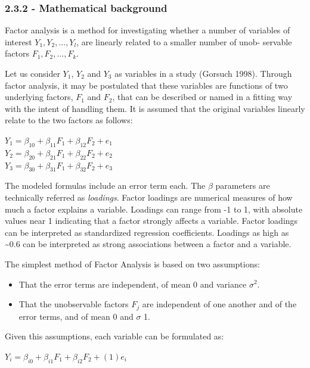 \documentclass[]{article}
\begin{document}
\subsubsection{2.3.2 - Mathematical
background}\label{mathematical-background-2}

Factor analysis is a method for investigating whether a number of
variables of interest \(Y_1, Y_2,..., Y_l\), are linearly related to a
smaller number of unob- servable factors \(F_1, F_2,..., F_k\).

Let us consider \(Y_1\), \(Y_2\) and \(Y_3\) as variables in a study
(Gorsuch 1998). Through factor analysis, it may be postulated that these
variables are functions of two underlying factors, \(F_1\) and \(F_2\),
that can be described or named in a fitting way with the intent of
handling them. It is assumed that the original variables linearly relate
to the two factors as follows:

\(Y_1 = \beta_{10} + \beta_{11}F_1 + \beta_{12}F_2 + e_1\)\\\(Y_2 = \beta_{20} + \beta_{21}F_1 + \beta_{22}F_2 + e_2\)\\\(Y_3 = \beta_{30} + \beta_{31}F_1 + \beta_{32}F_2 + e_3\)

The modeled formulas include an error term each. The \(\beta\)
parameters are technically referred as \emph{loadings}. Factor loadings
are numerical measures of how much a factor explains a variable.
Loadings can range from -1 to 1, with absolute values near 1 indicating
that a factor strongly affects a variable. Factor loadings can be
interpreted as standardized regression coefficients. Loadings as high as
\textasciitilde{}0.6 can be interpreted as strong associations between a
factor and a variable.

The simplest method of Factor Analysis is based on two assumptions:

\begin{itemize}
\itemsep1pt\parskip0pt
\item
  That the error terms are independent, of mean 0 and variance
  \(\sigma^2\).\\
\item
  That the unobservable factors \(F_j\) are independent of one another
  and of the error terms, and of mean 0 and \(\sigma\) 1.
\end{itemize}

Given this assumptions, each variable can be formulated as:

\(Y_i = \beta_{i0} + \beta_{i1}F_1 + \beta_{i2}F_2 + (1)e_i\)
\end{document}
